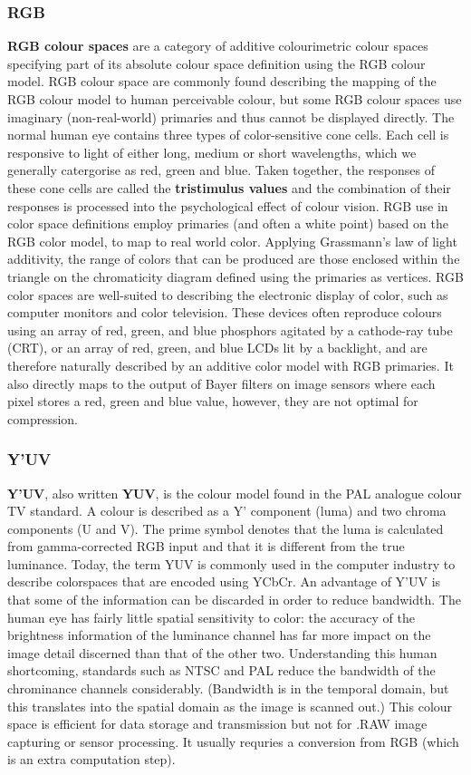 \subsubsection{RGB}
\textbf{RGB colour spaces} are a category of additive colourimetric colour spaces specifying part of its absolute colour space definition using the RGB colour model.
\nl
RGB colour space are commonly found describing the mapping of the RGB colour model to human perceivable colour, but some RGB colour spaces use imaginary (non-real-world) primaries and thus cannot be displayed directly.
\nl
The normal human eye contains three types of color-sensitive cone cells. Each cell is responsive to light of either long, medium or short wavelengths, which we generally catergorise as red, green and blue. Taken together, the responses of these cone cells are called the \textbf{tristimulus values} and the combination of their responses is processed into the psychological effect of colour vision.
RGB use in color space definitions employ primaries (and often a white point) based on the RGB color model, to map to real world color. Applying Grassmann's law of light additivity, the range of colors that can be produced are those enclosed within the triangle on the chromaticity diagram defined using the primaries as vertices.
\nl
RGB color spaces are well-suited to describing the electronic display of color, such as computer monitors and color television. These devices often reproduce colours using an array of red, green, and blue phosphors agitated by a cathode-ray tube (CRT), or an array of red, green, and blue LCDs lit by a backlight, and are therefore naturally described by an additive color model with RGB primaries.
It also directly maps to the output of Bayer filters on image sensors where each pixel stores a red, green and blue value, however, they are not optimal for compression.

\subsubsection{Y'UV}
\textbf{Y'UV}, also written \textbf{YUV}, is the colour model found in the PAL analogue colour TV standard. A colour is described as a Y' component (luma) and two chroma components (U and V). The prime symbol denotes that the luma is calculated from gamma-corrected RGB input and that it is different from the true luminance.
Today, the term YUV is commonly used in the computer industry to describe colorspaces that are encoded using YCbCr.
\nl
An advantage of Y'UV is that some of the information can be discarded in order to reduce bandwidth. The human eye has fairly little spatial sensitivity to color: the accuracy of the brightness information of the luminance channel has far more impact on the image detail discerned than that of the other two. Understanding this human shortcoming, standards such as NTSC and PAL reduce the bandwidth of the chrominance channels considerably. (Bandwidth is in the temporal domain, but this translates into the spatial domain as the image is scanned out.)
\nl
This colour space is efficient for data storage and transmission but not for .RAW image capturing or sensor processing. It usually requries a conversion from RGB (which is an extra computation step).

